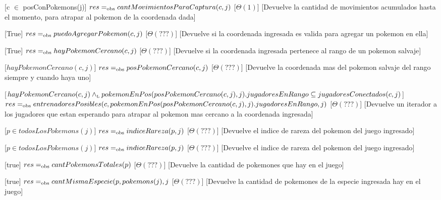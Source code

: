 \begin{Interfaz}
  [c $\in$ posConPokemons(j)]
  {$res =_{\mathrm{obs}} cantMovimientosParaCaptura(c,j)$}
  [$\Theta(1)$] %
  [Devuelve la cantidad de movimientos acumulados hasta el momento, para atrapar al pokemon de la coordenada dada]

  [True]
  {$res =_{\mathrm{obs}} puedoAgregarPokemon(c,j)$}
  [$\Theta(???)$] 
  [Devuelve si la coordenada ingresada es valida para agregar un pokemon en ella]

  [True]
  {$res =_{\mathrm{obs}} hayPokemonCercano(c,j)$}
  [$\Theta(???)$] 
  [Devuelve si la coordenada ingresada pertenece al rango de un pokemon salvaje]   

  [$hayPokemonCercano(c,j)$]
  {$res =_{\mathrm{obs}} posPokemonCercano(c,j)$}
  [$\Theta(???)$] %
  [Devuelve la coordenada mas del pokemon salvaje del rango siempre y cuando haya uno]   

  [$hayPokemonCercano(c,j) \land_{\mathrm{\scriptscriptstyle{L}}} pokemonEnPos(posPokemonCercano(c,j),j).jugadoresEnRango \subseteq jugadoresConectados(c,j)$]
  {$res =_{\mathrm{obs}} entrenadoresPosibles(c,pokemonEnPos(posPokemonCercano(c,j),j).jugadoresEnRango,j)$}
  [$\Theta(???)$] 
  [Devuelve un iterador a los jugadores que estan esperando para atrapar al pokemon mas cercano a la coordenada ingresada]   

  [$p \in todosLosPokemons(j)$]
  {$res =_{\mathrm{obs}} indiceRareza(p,j)$}
  [$\Theta(???)$] 
  [Devuelve el indice de rareza del pokemon del juego ingresado]

  [$p \in todosLosPokemons(j)$]
  {$res =_{\mathrm{obs}} indiceRareza(p,j)$}
  [$\Theta(???)$] 
  [Devuelve el indice de rareza del pokemon del juego ingresado]

  [true]
  {$res =_{\mathrm{obs}} cantPokemonsTotales(p)$}
  [$\Theta(???)$] 
  [Devuelve la cantidad de pokemones que hay en el juego]

  [true]
  {$res =_{\mathrm{obs}} cantMismaEspecie(p, pokemons(j), j$}
  [$\Theta(???)$] 
  [Devuelve la cantidad de pokemones de la especie ingresada hay en el juego]

  
\end{Interfaz}


